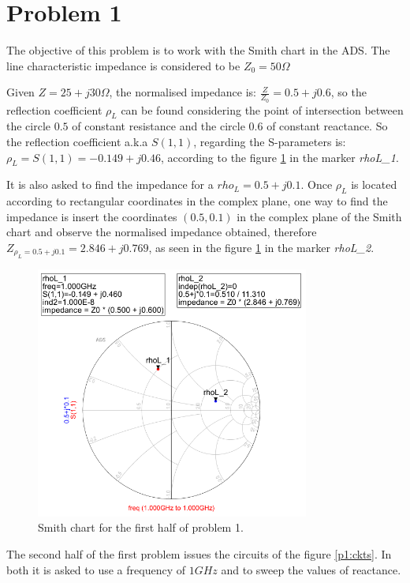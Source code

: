\section{Problem 1}

The objective of this problem is to work with the Smith chart in the ADS. The line characteristic impedance is considered to be $Z_0 = 50 \Omega$

Given $Z = 25 + j30 \Omega$, the normalised impedance is: $\frac{Z}{Z_0} = 0.5 + j0.6$, so the reflection coefficient $\rho_L$ can be found considering the point of intersection between the circle $0.5$ of constant resistance and the circle $0.6$ of constant reactance. So the reflection coefficient a.k.a $S(1,1)$, regarding the S-parameters is: $\rho_L = S(1,1) = -0.149 + j0.46$, according to the figure \ref{p1:smith1} in the marker \textit{rhoL\_1}. 

It is also asked to find the impedance for a $rho_L = 0.5 + j0.1$. Once $\rho_L$ is located according to rectangular coordinates in the complex plane, one way to find the impedance is insert the coordinates $(0.5, 0.1)$ in the complex plane of the Smith chart and observe the normalised impedance obtained, therefore $Z_{\rho_L=0.5 + j0.1} = 2.846 + j0.769$, as seen in the figure \ref{p1:smith1} in the marker \textit{rhoL\_2}.

\begin{figure}[H] 
\centering
\includegraphics[width=9cm]{images/smith1.PNG}
\caption{Smith chart for the first half of problem 1.}
\label{p1:smith1} 
\end{figure}


The second half of the first problem issues the circuits of the figure \ref{p1:ckts}. In both it is asked to use a frequency of $1 GHz$ and to sweep the values of reactance. 

